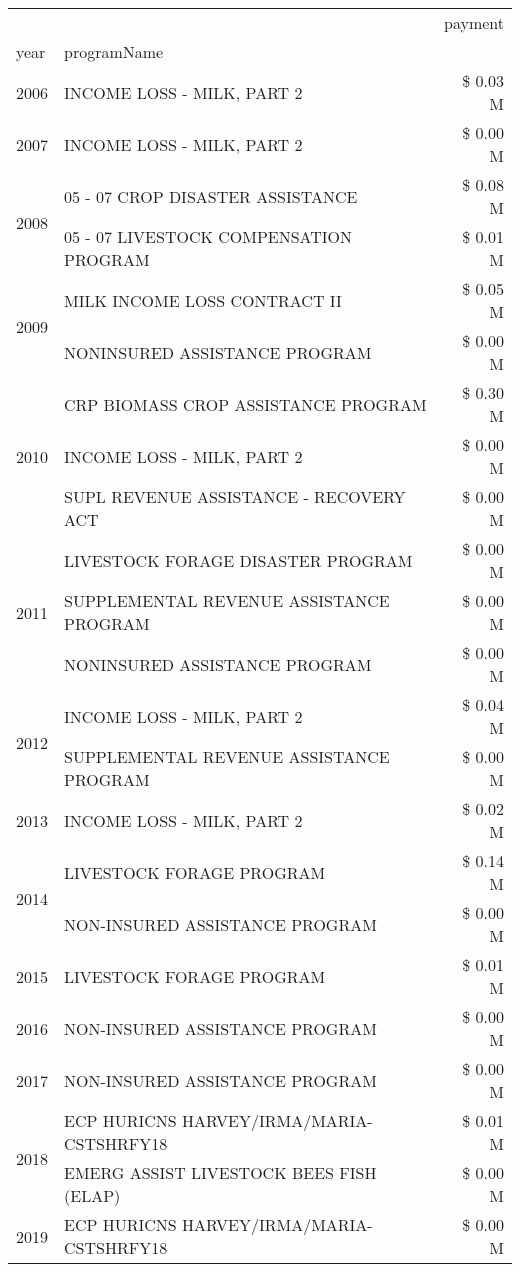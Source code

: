 \begin{tabular}{llr}
\toprule
 &  & payment \\
year & programName &  \\
\midrule
2006 & INCOME LOSS - MILK, PART 2 & \$ 0.03 M \\
\cline{1-3}
2007 & INCOME LOSS - MILK, PART 2 & \$ 0.00 M \\
\cline{1-3}
\multirow[t]{2}{*}{2008} & 05 - 07 CROP DISASTER ASSISTANCE & \$ 0.08 M \\
 & 05 - 07 LIVESTOCK COMPENSATION PROGRAM & \$ 0.01 M \\
\cline{1-3}
\multirow[t]{2}{*}{2009} & MILK INCOME LOSS CONTRACT II & \$ 0.05 M \\
 & NONINSURED ASSISTANCE PROGRAM & \$ 0.00 M \\
\cline{1-3}
\multirow[t]{3}{*}{2010} & CRP BIOMASS CROP ASSISTANCE PROGRAM & \$ 0.30 M \\
 & INCOME LOSS - MILK, PART 2 & \$ 0.00 M \\
 & SUPL REVENUE ASSISTANCE - RECOVERY ACT & \$ 0.00 M \\
\cline{1-3}
\multirow[t]{3}{*}{2011} & LIVESTOCK FORAGE DISASTER PROGRAM & \$ 0.00 M \\
 & SUPPLEMENTAL REVENUE ASSISTANCE PROGRAM & \$ 0.00 M \\
 & NONINSURED ASSISTANCE PROGRAM & \$ 0.00 M \\
\cline{1-3}
\multirow[t]{2}{*}{2012} & INCOME LOSS - MILK, PART 2 & \$ 0.04 M \\
 & SUPPLEMENTAL REVENUE ASSISTANCE PROGRAM & \$ 0.00 M \\
\cline{1-3}
2013 & INCOME LOSS - MILK, PART 2 & \$ 0.02 M \\
\cline{1-3}
\multirow[t]{2}{*}{2014} & LIVESTOCK FORAGE PROGRAM & \$ 0.14 M \\
 & NON-INSURED ASSISTANCE PROGRAM & \$ 0.00 M \\
\cline{1-3}
2015 & LIVESTOCK FORAGE PROGRAM & \$ 0.01 M \\
\cline{1-3}
2016 & NON-INSURED ASSISTANCE PROGRAM & \$ 0.00 M \\
\cline{1-3}
2017 & NON-INSURED ASSISTANCE PROGRAM & \$ 0.00 M \\
\cline{1-3}
\multirow[t]{2}{*}{2018} & ECP HURICNS HARVEY/IRMA/MARIA-CSTSHRFY18 & \$ 0.01 M \\
 & EMERG ASSIST LIVESTOCK BEES FISH (ELAP) & \$ 0.00 M \\
\cline{1-3}
\multirow[t]{2}{*}{2019} & ECP HURICNS HARVEY/IRMA/MARIA-CSTSHRFY18 & \$ 0.00 M \\

\end{tabular}
